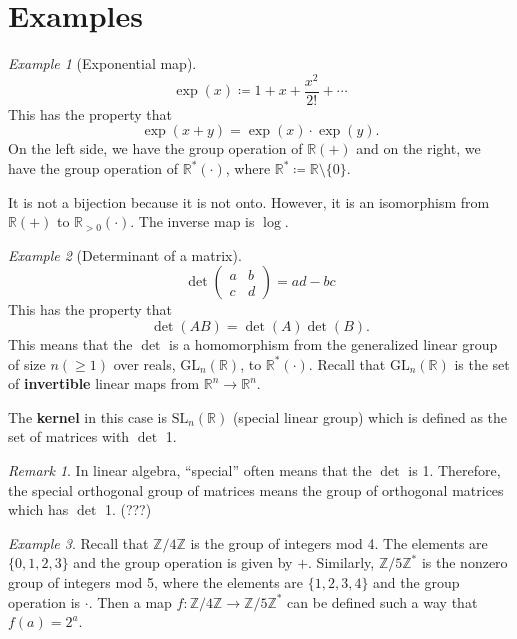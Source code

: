 \documentclass{report}
\theoremstyle{definition}\newtheorem{definition}{Definition}
\theoremstyle{remark}\newtheorem{remark}{Remark}
\theoremstyle{remark}\newtheorem{example}{Example}
\begin{document}
\section{Examples}
\begin{example}[Exponential map] 
\[\exp(x)\coloneqq 1+x+\frac{x^2}{2!}+\cdots\] 
This has the property that \[\exp(x+y)=\exp(x)\cdot\exp(y).\] On the left side, we have the group operation of $\mathbb{R}(+)$ and on the right, we have the group operation of $\mathbb{R}^*(\cdot)$, where $\mathbb{R}^*\coloneqq\mathbb{R}\setminus\{0\}$.

It is not a bijection because it is not onto. However, it is an isomorphism from $\mathbb{R}(+)$ to $\mathbb{R}_{>0}(\cdot)$. The inverse map is $\log$.
\end{example}
\begin{example}[Determinant of a matrix]
\[\det\begin{pmatrix}
a & b\\
c & d
\end{pmatrix}=ad-bc\]
This has the property that \[\det(AB)=\det(A)\det(B).\]
This means that the $\det$ is a homomorphism from the generalized linear group of size $n(\geq 1)$ over reals, $\text{GL}_n(\mathbb{R})$, to $\mathbb{R}^*(\cdot)$. Recall that $\text{GL}_n(\mathbb{R})$ is the set of \textbf{invertible} linear maps from $\mathbb{R}^n\to\mathbb{R}^n$.

The \textbf{kernel} in this case is $\text{SL}_n(\mathbb{R})$ (special linear group) which is defined as the set of matrices with $\det$ 1.
\end{example}
\begin{remark}
In linear algebra, ``special'' often means that the $\det$ is 1. Therefore, the special orthogonal group of matrices means the group of orthogonal matrices which has $\det$ 1. (???)
\end{remark}

\begin{example}
Recall that $\mathbb{Z}/4\mathbb{Z}$ is the group of integers mod 4. The elements are $\{0,1,2,3\}$ and the group operation is given by $+$. Similarly, $\mathbb{Z}/5\mathbb{Z}^*$ is the nonzero group of integers mod 5, where the elements are $\{1,2,3,4\}$ and the group operation is $\cdot$. Then a map $f:\mathbb{Z}/4\mathbb{Z}\to \mathbb{Z}/5\mathbb{Z}^*$ can be defined such a way that $f(a)=2^a$.
\end{example}
\end{document}
